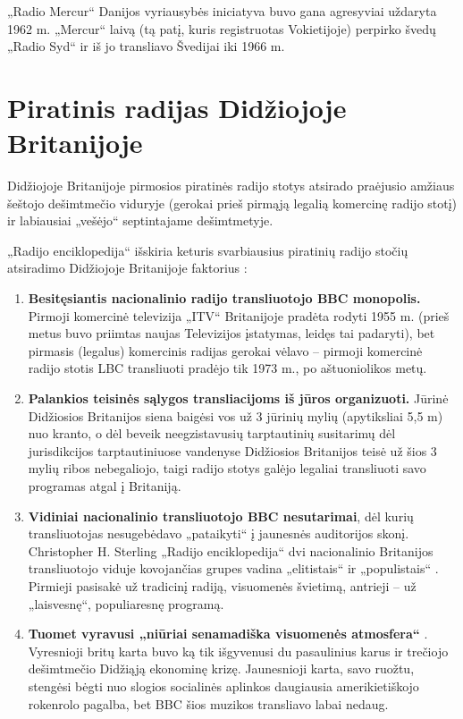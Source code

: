 \documentclass[kursinis-darbas]{vukf}
\begin{document}
„Radio Mercur“ Danijos vyriausybės iniciatyva buvo gana agresyviai uždaryta 1962 m. \cite[p.~447]{js_continuum_encyclopedia} „Mercur“ laivą (tą patį, kuris registruotas Vokietijoje) perpirko švedų „Radio Syd“ ir iš jo transliavo Švedijai iki 1966 m.


\section{Piratinis radijas Didžiojoje Britanijoje}

Didžiojoje Britanijoje pirmosios piratinės radijo stotys atsirado praėjusio amžiaus šeštojo dešimtmečio viduryje (gerokai prieš pirmąją legalią komercinę radijo stotį) ir labiausiai „vešėjo“ septintajame dešimtmetyje.

„Radijo enciklopedija“ išskiria keturis svarbiausius piratinių radijo stočių atsiradimo Didžiojoje Britanijoje faktorius \cite[p.~237]{chs_encyclopedia_of_radio}:

\begin{enumerate}
	\item \textbf{Besitęsiantis nacionalinio radijo transliuotojo \gls{BBC} monopolis.} Pirmoji komercinė televizija „ITV“ Britanijoje pradėta rodyti 1955 m. \cite{itv_first_commercial_tv_in_britain} (prieš metus buvo priimtas naujas Televizijos įstatymas, leidęs tai padaryti), bet pirmasis (legalus) komercinis radijas gerokai vėlavo – pirmoji komercinė radijo stotis LBC transliuoti pradėjo tik 1973 m., po aštuoniolikos metų.
	\item \textbf{Palankios teisinės sąlygos transliacijoms iš jūros organizuoti.} Jūrinė Didžiosios Britanijos siena baigėsi vos už 3 jūrinių mylių (apytiksliai 5,5 m) nuo kranto, o dėl beveik neegzistavusių tarptautinių susitarimų dėl jurisdikcijos tarptautiniuose vandenyse Didžiosios Britanijos teisė už šios 3 mylių ribos nebegaliojo, taigi radijo stotys galėjo legaliai transliuoti savo programas atgal į Britaniją.
	\item \textbf{Vidiniai nacionalinio transliuotojo \gls{BBC} nesutarimai}, dėl kurių transliuotojas nesugebėdavo „pataikyti“ į jaunesnės auditorijos skonį. Christopher H. Sterling „Radijo enciklopedija“ dvi nacionalinio Britanijos transliuotojo viduje kovojančias grupes vadina „elitistais“ ir „populistais“ \cite[p.~237]{chs_encyclopedia_of_radio}. Pirmieji pasisakė už tradicinį radiją, visuomenės švietimą, antrieji – už „laisvesnę“, populiaresnę programą.
	\item \textbf{Tuomet vyravusi „niūriai senamadiška visuomenės atmosfera“} \cite[p.~237]{chs_encyclopedia_of_radio}. Vyresnioji britų karta buvo ką tik išgyvenusi du pasaulinius karus ir trečiojo dešimtmečio Didžiąją ekonominę krizę. Jaunesnioji karta, savo ruožtu, stengėsi bėgti nuo slogios socialinės aplinkos daugiausia amerikietiškojo rokenrolo pagalba, bet \gls{BBC} šios muzikos transliavo labai nedaug.
\end{enumerate}
\end{document}
